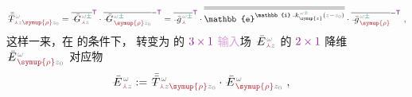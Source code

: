 \begin{align} \label{eq:transition_matrix-transverse_input}
	\Xint{\mathcolor{gray}{-}}{32}{\bar{\bar{T}}}^{\;\!\mathcolor{gray}{\omega}}_{\;\! \textcolor{Maroon}{\Yup} \mathcolor{gray}{z} \textcolor{Maroon}{\symup{\rho}} \mathcolor{gray}{z_0}} = \overline{\Xint{\mathcolor{gray}{-}}{20}{\bar{G}}^{\;\!\mathcolor{gray}{\omega} \textcolor{PineGreen}{\pm}}_{\;\! \textcolor{Maroon}{\Yup} \mathcolor{gray}{z}}}^{\mathsf{\textcolor{Plum}{T}}} \cdot \overline{\Xint{\mathcolor{gray}{-}}{20}{\bar{G}}^{\;\!\mathcolor{gray}{\omega} \textcolor{PineGreen}{\pm}}_{\;\! \textcolor{Maroon}{\symup{\rho}} \mathcolor{gray}{z_0}}}^{-\mathsf{\textcolor{Plum}{T}}} = \overline{\Xint{{}^{}_{\mathcolor{gray}{-}}}{10}{\bar{g}}^{\;\!\mathcolor{gray}{\omega} \textcolor{PineGreen}{\pm}}_{\;\! \textcolor{Maroon}{\Yup}}}^{\mathsf{\textcolor{Plum}{T}}} \cdot \overline{\overline{\mathbb{e}^{\mathbb{i} \Xint{\begin{smallmatrix} ~ \\ {}^{}_{\mathcolor{gray}{-}} \\ ~ \end{smallmatrix}}{15}{k}_{\symup{z}}^{\;\! \mathcolor{gray}{\omega} \textcolor{PineGreen}{\pm}} \left( \mathcolor{gray}{z} - \mathcolor{gray}{z_0} \right)}}} \cdot \overline{\Xint{{}^{}_{\mathcolor{gray}{-}}}{10}{\bar{g}}^{\;\!\mathcolor{gray}{\omega} \textcolor{PineGreen}{\pm}}_{\;\! \textcolor{Maroon}{\symup{\rho}}}}^{-\mathsf{\textcolor{Plum}{T}}} ~,
\end{align}
这样一来，在  的条件下， 转变为  的 $\textcolor{Plum}{3 \times 1}$ \textcolor{Plum}{输入}场 $\Xint{\mathcolor{gray}{-}}{25}{\bar{E}}^{\;\!\mathcolor{gray}{\omega}}_{\;\! \textcolor{Maroon}{\Yup} \mathcolor{gray}{z}}$ 的 $\textcolor{Plum}{2 \times 1}$ 降维 $\Xint{\mathcolor{gray}{-}}{25}{\bar{E}}^{\;\!\mathcolor{gray}{\omega}}_{\;\! \textcolor{Maroon}{\symup{\rho}} \mathcolor{gray}{z_0}}$ 对应物
\begin{align} \label{eq:E=transition_matrix-Erho}
	\Xint{\mathcolor{gray}{-}}{30}{\bar{E}}^{\;\!\mathcolor{gray}{\omega}}_{\;\! \textcolor{Maroon}{\Yup} \mathcolor{gray}{z}} &:= \Xint{\mathcolor{gray}{-}}{32}{\bar{\bar{T}}}^{\;\!\mathcolor{gray}{\omega}}_{\;\! \textcolor{Maroon}{\Yup} \mathcolor{gray}{z} \textcolor{Maroon}{\symup{\rho}} \mathcolor{gray}{z_0}} \cdot \Xint{\mathcolor{gray}{-}}{30}{\bar{E}}^{\;\!\mathcolor{gray}{\omega}}_{\;\! \textcolor{Maroon}{\symup{\rho}} \mathcolor{gray}{z_0}} ~,
\end{align}
